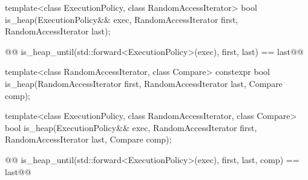 \begin{itemdescr}
\pnum
\removed{\returns} 
\end{itemdescr}

%
\begin{itemdecl}
template<class ExecutionPolicy, class RandomAccessIterator>
  bool is_heap(ExecutionPolicy&& exec,
               RandomAccessIterator first, RandomAccessIterator last);
\end{itemdecl}

\begin{itemdescr}
\pnum
\removed{\returns} 
\begin{codeblock}
@@ is_heap_until(std::forward<ExecutionPolicy>(exec), first, last) == last@\added{;}@
\end{codeblock}
\end{itemdescr}

%
\begin{itemdecl}
template<class RandomAccessIterator, class Compare>
  constexpr bool is_heap(RandomAccessIterator first, RandomAccessIterator last,
                         Compare comp);
\end{itemdecl}

\begin{itemdescr}
\pnum
\removed{\returns} 
\end{itemdescr}

%
\begin{itemdecl}
template<class ExecutionPolicy, class RandomAccessIterator, class Compare>
  bool is_heap(ExecutionPolicy&& exec,
               RandomAccessIterator first, RandomAccessIterator last,
               Compare comp);
\end{itemdecl}

\begin{itemdescr}
\pnum
\removed{\returns} 
\begin{codeblock}
@@ is_heap_until(std::forward<ExecutionPolicy>(exec), first, last, comp) == last@\added{;}@
\end{codeblock}
\end{itemdescr}

